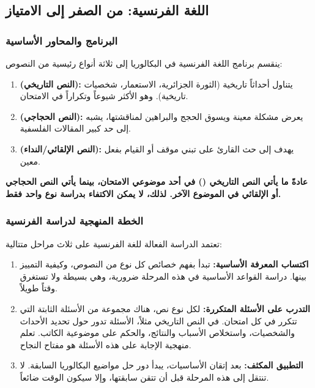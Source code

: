 \documentclass[12pt,a4paper]{book}
\newcommand{\importantAr}[1]{%
	\begin{important}
		\bfseries #1
	\end{important}
}
\begin{document}
	
	\subsection{اللغة الفرنسية: من الصفر إلى الامتياز}
	
	\subsubsection{البرنامج والمحاور الأساسية}
	
	ينقسم برنامج اللغة الفرنسية في البكالوريا إلى ثلاثة أنواع رئيسية من النصوص:
	
	\begin{enumerate}
		\item \textbf{ (النص التاريخي):} يتناول أحداثاً تاريخية (الثورة الجزائرية، الاستعمار، شخصيات تاريخية). وهو الأكثر شيوعاً وتكراراً في الامتحان.
		\item \textbf{ (النص الحجاجي):} يعرض مشكلة معينة ويسوق الحجج والبراهين لمناقشتها، يشبه إلى حد كبير المقالات الفلسفية.
		\item \textbf{ (النص الإلقائي/النداء):} يهدف إلى حث القارئ على تبني موقف أو القيام بفعل معين.
	\end{enumerate}
	
	\importantAr{عادةً ما يأتي النص التاريخي () في أحد موضوعي الامتحان، بينما يأتي النص الحجاجي أو الإلقائي في الموضوع الآخر. لذلك، لا يمكن الاكتفاء بدراسة نوع واحد فقط.}
	
	\subsubsection{الخطة المنهجية لدراسة الفرنسية}
	
	تعتمد الدراسة الفعالة للغة الفرنسية على ثلاث مراحل متتالية:
	
	\begin{enumerate}
		\item \textbf{اكتساب المعرفة الأساسية:} تبدأ بفهم خصائص كل نوع من النصوص، وكيفية التمييز بينها. دراسة القواعد الأساسية في هذه المرحلة ضرورية، وهي بسيطة ولا تستغرق وقتاً طويلاً.
		\item \textbf{التدرب على الأسئلة المتكررة:} لكل نوع نص، هناك مجموعة من الأسئلة الثابتة التي تتكرر في كل امتحان. في النص التاريخي مثلاً، الأسئلة تدور حول تحديد الأحداث والشخصيات، واستخلاص الأسباب والنتائج، والحكم على موضوعية الكاتب. تعلم منهجية الإجابة على هذه الأسئلة هو مفتاح النجاح.
		\item \textbf{التطبيق المكثف:} بعد إتقان الأساسيات، يبدأ دور حل مواضيع البكالوريا السابقة. لا تنتقل إلى هذه المرحلة قبل أن تتقن سابقتها، وإلا سيكون الوقت ضائعاً.
	\end{enumerate}
	
\end{document}
